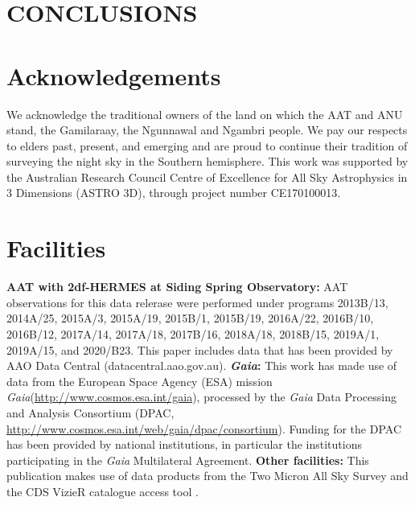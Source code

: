 \documentclass[
  journal=pasa,
  manuscript=research-paper, %
  year=2023,
  volume=37
]{cup-journal}
\newcommand{\SB}[1]{{\textcolor{purple}{#1}}}
\newcommand{\Gaia}{\textit{Gaia}\xspace}
\begin{document}

\newpage
\section{CONCLUSIONS}
\label{sec:conclusion}

\section*{Acknowledgements}

We acknowledge the traditional owners of the land on which the AAT and ANU stand, the Gamilaraay, the Ngunnawal and Ngambri people. We pay our respects to elders past, present, and emerging and are proud to continue their tradition of surveying the night sky in the Southern hemisphere.
This work was supported by the Australian Research Council Centre of Excellence for All Sky Astrophysics in 3 Dimensions (ASTRO 3D), through project number CE170100013.

\section*{Facilities}

\textbf{AAT with 2df-HERMES at Siding Spring Observatory:}
AAT observations for this data relerase were performed under programs {2013B/13}, {2014A/25}, {2015A/3}, {2015A/19}, {2015B/1}, {2015B/19}, {2016A/22}, {2016B/10}, {2016B/12}, {2017A/14}, {2017A/18}, {2017B/16}, {2018A/18}, {2018B/15}, {2019A/1}, {2019A/15}, and {2020/B23}. This paper includes data that has been provided by AAO Data Central (datacentral.aao.gov.au).
\textbf{\Gaia: } This work has made use of data from the European Space Agency (ESA) mission \Gaia (\url{http://www.cosmos.esa.int/gaia}), processed by the \Gaia Data Processing and Analysis Consortium (DPAC, \url{http://www.cosmos.esa.int/web/gaia/dpac/consortium}). Funding for the DPAC has been provided by national institutions, in particular the institutions participating in the \Gaia Multilateral Agreement. 
\textbf{Other facilities:} This publication makes use of data products from the Two Micron All Sky Survey \citep{Skrutskie2006} and the CDS VizieR catalogue access tool \citep{Vizier2000}.
\end{document}
